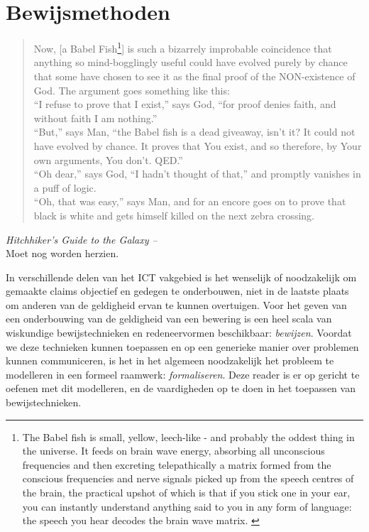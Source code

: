 \chapter{Bewijsmethoden}\label{ch:bew:meth}
\begin{quote}
Now, [a Babel Fish\footnote{The Babel fish is small, yellow, leech-like - and probably the oddest thing in the universe. It feeds on brain wave energy, absorbing all unconscious frequencies and then excreting telepathically a matrix formed from the conscious frequencies and nerve signals picked up from the speech centres of the brain, the practical upshot of which is that if you stick one in your ear, you can instantly understand anything said to you in any form of language: the speech you hear decodes the brain wave matrix. \cite{adams}}] is such a bizarrely improbable coincidence that anything so mind-bogglingly useful could have evolved purely by chance that some have chosen to see it as the final proof of the NON-existence of God. The argument goes something like this:\\[2.5pt]
``I refuse to prove that I exist,'' says God, ``for proof denies faith, and without faith I am nothing.''\\[2.5pt]
``But,'' says Man, ``the Babel fish is a dead giveaway, isn't it? It could not have evolved by chance. It proves that You exist, and so therefore, by Your own arguments, You don't. QED.''\\[2.5pt]
``Oh dear,'' says God, ``I hadn't thought of that,'' and promptly vanishes in a puff of logic.\\[2.5pt]
``Oh, that was easy,'' says Man, and for an encore goes on to prove that black is white and gets himself killed on the next zebra crossing.
\end{quote}
\mbox{}\hfill\textit{Hitchhiker's Guide to the Galaxy -- \cite{adams}}\\[5pt]

{ \color{hured} Moet nog worden herzien.}

In verschillende delen van het ICT vakgebied is het wenselijk of noodzakelijk om gemaakte claims objectief en gedegen te onderbouwen, niet in de laatste plaats om anderen van de geldigheid ervan te kunnen overtuigen. Voor het geven van een onderbouwing van de geldigheid van een bewering is een heel scala van wiskundige bewijstechnieken en redeneervormen beschikbaar: \textit{bewijzen}. Voordat we deze technieken kunnen toepassen en op een generieke manier over problemen kunnen communiceren, is het in het algemeen noodzakelijk het probleem te modelleren in een formeel raamwerk: \textit{formaliseren}. Deze reader is er op gericht te oefenen met dit modelleren, en de vaardigheden op te doen in het toepassen van bewijstechnieken. 

